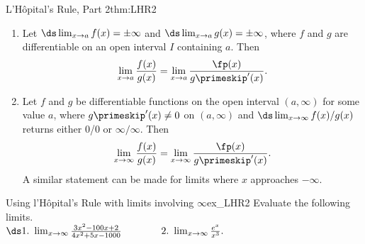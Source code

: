 \begin{theorem}{L'H\^opital's Rule, Part 2}{thm:LHR2}
{\begin{enumerate}
\item		Let $\ds\lim_{x\to a}f(x) = \pm\infty$ and $\ds\lim_{x\to a}g(x)=\pm \infty$, where $f$ and $g$ are differentiable on an open interval $I$ containing $a$. Then 
$$\lim_{x\to a} \frac{f(x)}{g(x)} = \lim_{x\to a}\frac{\fp(x)}{g\primeskip'(x)}.$$

\item		Let $f$ and $g$ be differentiable functions on the open interval $(a,\infty)$ for some value $a$, where $g\primeskip'(x)\neq 0$ on $(a,\infty)$ and $\ds\lim_{x\to\infty} f(x)/g(x)$ returns either 0/0 or $\infty/\infty$. Then
$$\lim_{x\to \infty} \frac{f(x)}{g(x)} = \lim_{x\to \infty}\frac{\fp(x)}{g\primeskip'(x)}.$$
A similar statement can be made for limits where $x$ approaches $-\infty$.
\end{enumerate}
}
\end{theorem}


\begin{example}{Using l'H\^opital's Rule with limits involving $\infty$}{ex_LHR2}
{
Evaluate the following limits.\\

$\ds 1.\ \lim_{x\to\infty} \frac{3x^2-100x+2}{4x^2+5x-1000} \qquad\qquad 2. \ \lim_{x\to \infty}\frac{e^x}{x^3}.$
}

\end{example}


